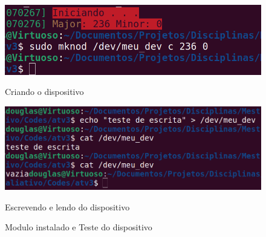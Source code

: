 \documentclass{article}
\begin{document}
\begin{figure}[ht]
  \centering
  \begin{minipage}{0.45\textwidth}
      \centering
      \includegraphics[width=\textwidth]{Images/atv2-1.png}
      \caption{Criando o dispositivo}
      \label{fig:imagem1}
  \end{minipage}\hfill
  \begin{minipage}{0.45\textwidth}
      \centering
      \includegraphics[width=\textwidth]{Images/atv22.png}
      \caption{Escrevendo e lendo do dispositivo}
      \label{fig:imagem2}
  \end{minipage}
  \caption{Modulo instalado e Teste do dispositivo}
  \label{fig:exec2}
\end{figure}

\printbibliography %
\end{document}
